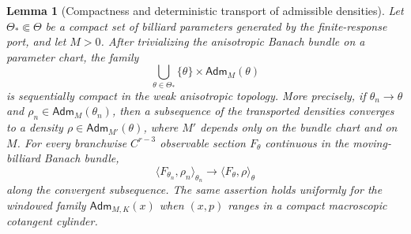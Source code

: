 \documentclass[12pt, letterpaper]{amsart}
\newcommand{\Thetacal}{\Theta}
\newcommand{\Adm}{\mathsf{Adm}}
\theoremstyle{plain}
\newtheorem{lemma}[theorem]{Lemma}
\theoremstyle{definition}
\theoremstyle{remark}
\begin{document}
\begin{lemma}[Compactness and deterministic transport of admissible densities]
\label{lem:admissible_density_compact_transport}
Let $\Theta_*\Subset\Thetacal$ be a compact set of billiard parameters generated
by the finite-response port, and let $M>0$.  After trivializing the anisotropic
Banach bundle on a parameter chart, the family
\begin{equation}
    \bigcup_{\theta\in\Theta_*}\{\theta\}\times\Adm_M(\theta)
\end{equation}
is sequentially compact in the weak anisotropic topology.  More precisely, if
$\theta_n\to\theta$ and $\rho_n\in\Adm_M(\theta_n)$, then a subsequence of the
transported densities converges to a density $\rho\in\Adm_{M'}(\theta)$, where
$M'$ depends only on the bundle chart and on $M$.  For every branchwise
$C^{r-3}$ observable section $F_\theta$ continuous in the moving-billiard
Banach bundle,
\begin{equation}
\label{eq:admissible_density_transport_pairing}
    \langle F_{\theta_n},\rho_n\rangle_{\theta_n}
      \longrightarrow
    \langle F_\theta,\rho\rangle_\theta
\end{equation}
along the convergent subsequence.  The same assertion holds uniformly for the
windowed family $\Adm_{M,K}(x)$ when $(x,p)$ ranges in a compact macroscopic
cotangent cylinder.
\end{lemma}
\end{document}
